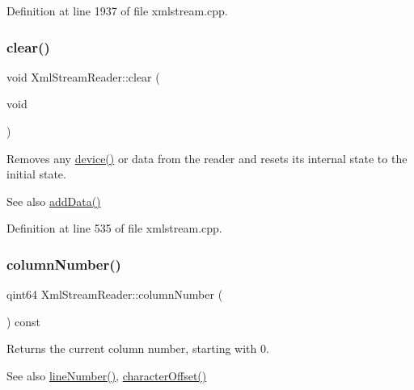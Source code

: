 Definition at line 1937 of file xmlstream.\+cpp.

\mbox{\label{class_xml_stream_reader_a2a67f5a1fff83d33214ccc9ec9494ca0}} 
\subsubsection{\texorpdfstring{clear()}{clear()}}
{\footnotesize\ttfamily void Xml\+Stream\+Reader\+::clear (\begin{DoxyParamCaption}\item[{void}]{ }\end{DoxyParamCaption})}

Removes any \hyperlink{class_xml_stream_reader_aa2a751d1b36fac13138b2f370683dfe7}{device()} or data from the reader and resets its internal state to the initial state.

\begin{DoxySeeAlso}{See also}
\hyperlink{class_xml_stream_reader_add6baa0f8790fc528c1fa6e05755f96b}{add\+Data()} 
\end{DoxySeeAlso}


Definition at line 535 of file xmlstream.\+cpp.

\mbox{\label{class_xml_stream_reader_a88724d9577a835b0e8d84ed945c306df}} 
\subsubsection{\texorpdfstring{column\+Number()}{columnNumber()}}
{\footnotesize\ttfamily qint64 Xml\+Stream\+Reader\+::column\+Number (\begin{DoxyParamCaption}{ }\end{DoxyParamCaption}) const}

Returns the current column number, starting with 0.

\begin{DoxySeeAlso}{See also}
\hyperlink{class_xml_stream_reader_a74a3827867942f9904924f2004c4177e}{line\+Number()}, \hyperlink{class_xml_stream_reader_a08a187eb8969ddabf238e1f731bb754a}{character\+Offset()} 
\end{DoxySeeAlso}


